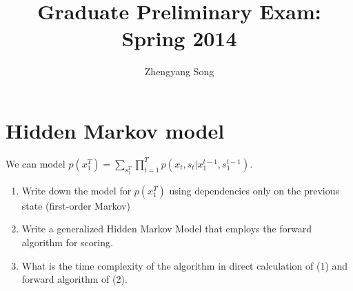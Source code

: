 \documentclass[a4paper]{article}
\title{Graduate Preliminary Exam: Spring 2014}
\author{Zhengyang Song}
\begin{document}
\maketitle



















\section{Hidden Markov model}

We can model $p(x_1^T)=\sum_{s_1^T}\prod_{t=1}^Tp(x_t,s_t|x_1^{t-1},s_1^{t-1})$.
\begin{enumerate}
\item Write down the model for $p(x_1^T)$ using dependencies only on the previous state (first-order Markov)
\item Write a generalized Hidden Markov Model that employs the forward algorithm for scoring.
\item What is the time complexity of the algorithm in direct calculation of (1) and forward algorithm of (2).
\end{enumerate}


\end{document}
